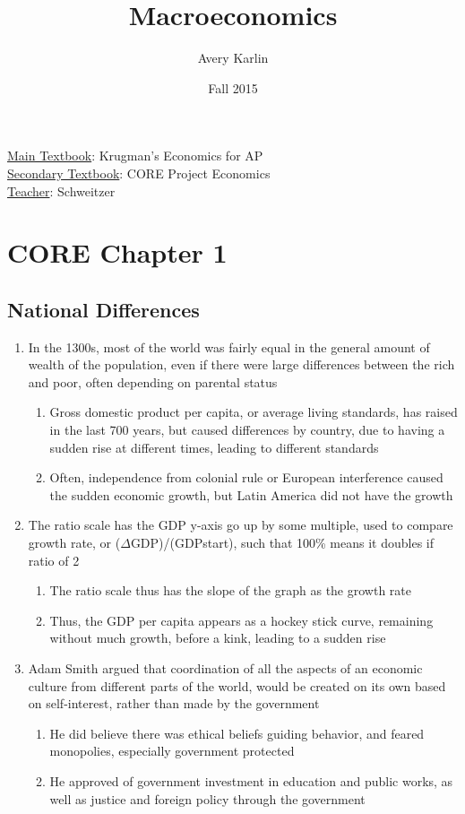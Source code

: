 \documentclass[11 pt, twoside]{article}
\begin{document}
\title{Macroeconomics}
\author{Avery Karlin}
\date{Fall 2015}

\maketitle
\newpage
\tableofcontents
\vspace{11pt}
\noindent
\underline{Main Textbook}: Krugman's Economics for AP\\
\underline{Secondary Textbook}: CORE Project Economics\\
\underline{Teacher}: Schweitzer
\newpage

\section{CORE Chapter 1}

\subsection{National Differences}
\begin{enumerate}
\item In the 1300s, most of the world was fairly equal in the general amount of wealth of the population, even if there
were large differences between the rich and poor, often depending on parental status
\begin{enumerate}
\item Gross domestic product per capita, or average living standards, has raised in the last 700 years, but caused
differences by country, due to having a sudden rise at different times, leading to different standards
\item Often, independence from colonial rule or European interference caused the sudden economic growth, but Latin
America did not have the growth
\end{enumerate}
\item The ratio scale has the GDP y{}-axis go up by some multiple, used to compare growth rate, or (${\Delta}$GDP)/(GDPstart), such that 100\% means it doubles if ratio of 2
\begin{enumerate}
\item The ratio scale thus has the slope of the graph as the growth rate
\item Thus, the GDP per capita appears as a hockey stick curve, remaining without much growth, before a kink, leading to
a sudden rise
\end{enumerate}
\item Adam Smith argued that coordination of all the aspects of an economic culture from different parts of the world,
would be created on its own based on self{}-interest, rather than made by the government
\begin{enumerate}
\item He did believe there was ethical beliefs guiding behavior, and feared monopolies, especially government protected
\item He approved of government investment in education and public works, as well as justice and foreign policy through
the government
\end{enumerate}
\end{enumerate}
\end{document}
